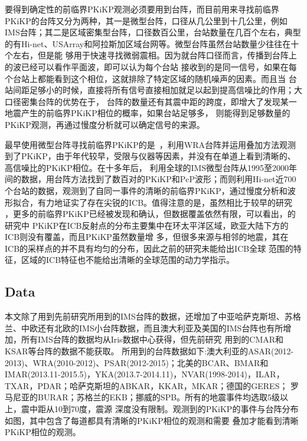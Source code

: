 要得到确定性的前临界PKiKP观测必须要用到台阵，而目前用来寻找前临界PKiKP的台阵又分为两种，其一是微型台阵，口径从几公里到十几公里，例如IMS台阵；其二是区域密集型台阵，口径数百公里，台站数量在几百个左右，典型的有Hi-net、USArray和阿拉斯加区域台网等。微型台阵虽然台站数量少往往在十个左右，但是能
够用于快速寻找微弱震相。因为就台阵口径而言，传播到台阵上的波已经可以看作平面波，即可以认为每个台站
接收到的是同一信号，如果在每个台站上都能看到这个相位，这就排除了特定区域的随机噪声的因素。而且当
台站间距足够小的时候，直接将所有信号直接相加就足以起到提高信噪比的作用；大口径密集台阵的优势在于， 台阵的数量还有其震中距的跨度，即增大了发现某一地震产生的前临界PKiKP相位的概率，如果台站足够多，
则能得到足够数量的PKiKP观测，再通过慢度分析就可以确定信号的来源。

最早使用微型台阵寻找前临界PKiKP的是~\cite{Souriau1989}，利用WRA台阵并运用叠加方法观测到了PKiKP，由于年代较早，受限与仪器等因素，并没有在单道上看到清晰的、高信噪比的PKiKP相位。在十多年后，
\cite{Koper2003}利用全球的IMS微型台阵从1995至2000年间的数据，用台阵方法找到了数百对的PKiKP和PcP波形；而\cite{Kawakatsu2006}则利用Hi-net近700个台站的数据，观测到了自同一事件的清晰的前临界PKiKP，通过慢度分析和波形拟合，有力地证实了存在尖锐的ICB。值得注意的是，虽然相比于较早的研究
，更多的前临界PKiKP已经被发现和确认，但数据覆盖依然有限，可以看出，\cite{Koper2003}的研究中
PKiKP在ICB反射点的分布主要集中在环太平洋区域，欧亚大陆下方的ICB则没有覆盖，而且PKiKP虽然数量增
多，但很多来源与相邻的地震，其在ICB的采样点的并不具有均匀的分布，因此之前的研究未能给出ICB全球
范围的特征，区域的ICB特征也不能给出清晰的全球范围的动力学指示。

\subsection{Data}

本文除了用到先前研究所用到的IMS台阵的数据，还增加了中亚哈萨克斯坦、苏格兰、中欧还有北欧的IMS小台阵数据，而且澳大利亚及美国的IMS台阵也有所增加，所有IMS台阵的数据均从Iris数据中心获得，但先前研究
用到的CMAR和KSAR等台阵的数据不能获取。
所用到的台阵数据如下:澳大利亚的ASAR(2012-2013)、WRA(2010-2012)、PSAR(2012-2015)；北美的BCAR、BMAR和IMAR(2013.11-2015.5)，YKA(2013.7-2014.11)，NVAR(1998-2014)，ILAR，TXAR，PDAR；哈萨克斯坦的ABKAR，KKAR，MKAR；德国的GERES；
罗马尼亚的BURAR；苏格兰的EKB；挪威的SPB。所有的地震事件均选取5级以上，震中距从10到70度，震源
深度没有限制。观测到的PKiKP的事件与台阵分布如图，其中包含了每道都具有清晰的PKiKP相位的观测和需要
叠加才能看到清晰PKiKP相位的观测。

